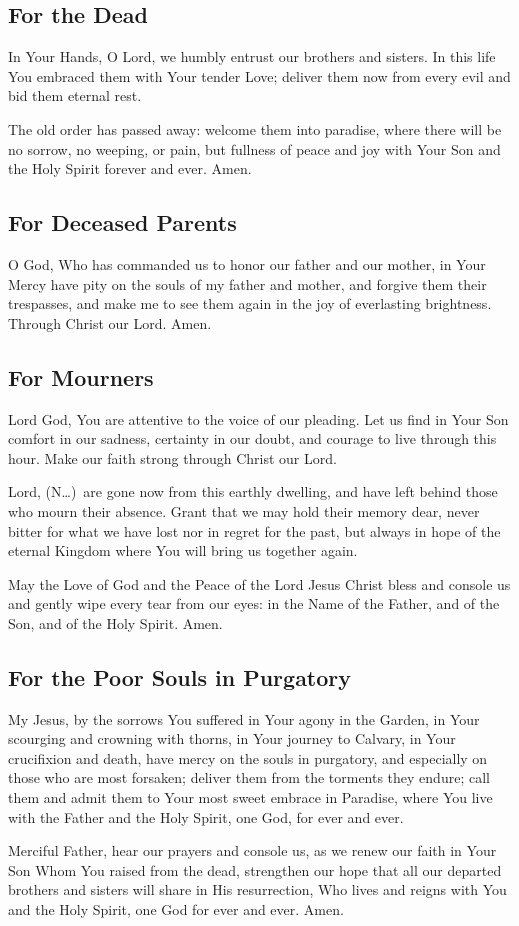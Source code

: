 \documentclass[12pt]{article}
\newcommand{\prayertitle}[1]{\subsection{#1}}
\newcommand{\insertname}{(N\dots)\xspace}
\begin{document}
\prayertitle{For the Dead}
\label{prayer:dead}
In Your Hands, O Lord, we humbly entrust our brothers and sisters.
In this life You embraced them with Your tender Love;
deliver them now from every evil and bid them eternal rest.

The old order has passed away:
welcome them into paradise, where there will be no sorrow, no weeping, or pain,
but fullness of peace and joy with Your Son and the Holy Spirit forever and ever.
Amen.

\prayertitle{For Deceased Parents}
O God, Who has commanded us to honor our father and our mother, in Your Mercy have pity on the souls of my father and mother, and forgive them their trespasses, and make me to see them again in the joy of everlasting brightness. Through Christ our Lord. Amen.

\prayertitle{For Mourners}
\label{prayer:mourners}
Lord God, You are attentive to the voice of our pleading.
Let us find in Your Son comfort in our sadness, certainty in our doubt, and courage to live through this hour.
Make our faith strong through Christ our Lord.

Lord, \insertname\ are gone now from this earthly dwelling, and have left behind those who mourn their absence.
Grant that we may hold their memory dear, never bitter for what we have lost
nor in regret for the past, but always in hope of the eternal Kingdom where You will bring us together again.

May the Love of God and the Peace of the Lord Jesus Christ bless and console us and gently wipe every tear from our eyes:
in the Name of the Father, and of the Son, and of the Holy Spirit.
Amen.

\prayertitle{For the Poor Souls in Purgatory}
\label{prayer:poor_souls_purgatory}
My Jesus, by the sorrows You suffered in Your agony in the Garden, in Your scourging and crowning with thorns, in Your journey to Calvary, in Your crucifixion and death, have mercy on the souls in purgatory, and especially on those who are most forsaken;
deliver them from the torments they endure;
call them and admit them to Your most sweet embrace in Paradise, where You live with the Father and the Holy Spirit, one God, for ever and ever.

Merciful Father, hear our prayers and console us, as we renew our faith in Your Son Whom You raised from the dead, strengthen our hope that all our departed brothers and sisters will share in His resurrection, Who lives and reigns with You and the Holy Spirit, one God for ever and ever.
Amen.
\end{document}

